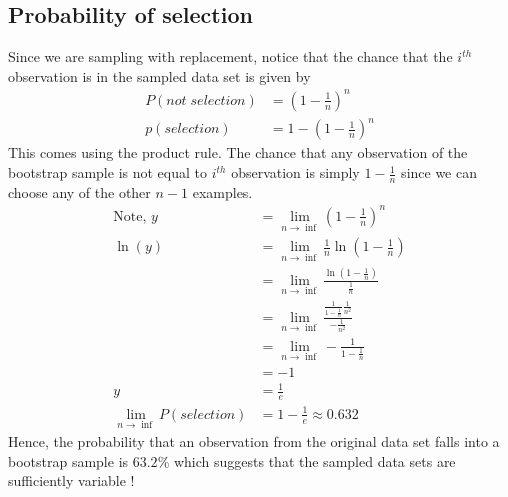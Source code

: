\documentclass[../statistical_learning_notes.tex]{subfiles}
\begin{document}
    \subsection{Probability of selection}
    Since we are sampling with replacement, notice that the chance that the $i^{th}$ observation is in the sampled data set is given by
    \begin{align*}
        P(not\;selection) &= (1-\frac{1}{n})^{n}\\
        p(selection) &= 1 - (1 - \frac{1}{n})^{n}
    \end{align*}
    This comes using the product rule. The chance that any observation of the bootstrap sample is not equal to $i^{th}$ observation is simply $1 - \frac{1}{n}$ since we can choose any of the other $n-1$ examples.
    \begin{align*}
        \text{Note, } y &= \lim_{n\to\inf}(1-\frac{1}{n})^{n}\\
                 \ln(y) &= \lim_{n\to\inf}\frac{1}{n}\ln(1-\frac{1}{n}) \\
                        &= \lim_{n\to\inf}\frac{\ln(1-\frac{1}{n})}{\frac{1}{n}} \\
                        &= \lim_{n\to\inf}\frac{\frac{1}{1-\frac{1}{n}} \frac{1}{n^{2}}}{-\frac{1}{n^{2}}} \tag*{Using L'Hospital's Rule}\\
                        &= \lim_{n\to\inf}-\frac{1}{1 - \frac{1}{n}}\\
                        &= -1\\
                      y &= \frac{1}{e}\\
        \lim_{n\to\inf} P(selection) &= 1 - \frac{1}{e} \approx 0.632
    \end{align*}
    Hence, the probability that an observation from the original data set falls into a bootstrap sample is $63.2\%$ which suggests that the sampled data sets are sufficiently variable !
\end{document}
